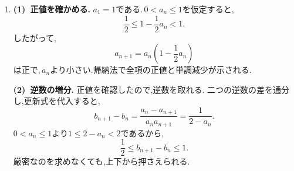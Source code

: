 \begin{enumerate}[label=\textbf{問\arabic*.},leftmargin=3.8em,format=\bookitemlink{practice-bridge}{solution}{problem}]
                \smallskip
                \textbf{(2)(3)~総量と偏りを追う.}
                チャートの「複数の」に沿って,連立型の和と差を試す.\,
                $\displaystyle s_n=x_n+y_n,d_n=x_n-y_n$とおけば,
                \[
                  s_{n+1}=s_n,\qquad d_{n+1}=\frac12d_n.
                \]
                $\displaystyle d_n\to0$だから食塩は両方に$\displaystyle 5\,\mathrm{g}$ずつ近づく.
                操作を繰り返しても総量は変わらず,二つの容器の偏りだけが減ることを式が表している.

                \noindent \textbf{【別解】}\\
                先に食塩の総量が変わらないことを使い,\,$\displaystyle y_n=10-x_n$を代入すると,
                \[
                  x_{n+1}=\frac12x_n+\frac52
                \]
                となる.$\displaystyle 5$を引けば,同じ答えが得られる.
          \item \textbf{(1)~正値を確かめる.}
                $\displaystyle a_1=1$である.\,$\displaystyle 0<a_n\le1$を仮定すると,
                \[
                  \frac12\le1-\frac12a_n<1.
                \]
                したがって,
                \[
                  a_{n+1}=a_n\left(1-\frac12a_n\right)
                \]
                は正で,\,$\displaystyle a_n$より小さい.帰納法で全項の正値と単調減少が示される.

                \smallskip
                \textbf{(2)~逆数の増分.}
                正値を確認したので,逆数を取れる.
                二つの逆数の差を通分し,更新式を代入すると,
                \[
                  b_{n+1}-b_n
                    =\frac{a_n-a_{n+1}}{a_na_{n+1}}
                    =\frac1{2-a_n}.
                \]
                $\displaystyle 0<a_n\le1$より$\displaystyle 1\le2-a_n<2$であるから,
                \[
                  \frac12\le b_{n+1}-b_n\le1.
                \]
                厳密なのを求めなくても,上下から押さえられる.


\end{enumerate}
